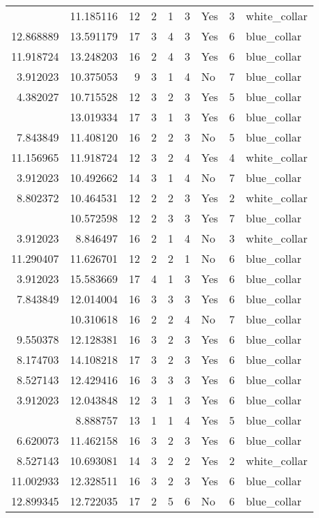 \documentclass[
]{article}
\begin{document}
\begin{longtable}[t]{rrrrrllrl}
\addlinespace
3.912023 & 11.185116 & 12 & 2 & 1 & 3 & Yes & 3 & white\_collar\\
12.868889 & 13.591179 & 17 & 3 & 4 & 3 & Yes & 6 & blue\_collar\\
11.918724 & 13.248203 & 16 & 2 & 4 & 3 & Yes & 6 & blue\_collar\\
3.912023 & 10.375053 & 9 & 3 & 1 & 4 & No & 7 & blue\_collar\\
4.382027 & 10.715528 & 12 & 3 & 2 & 3 & Yes & 5 & blue\_collar\\
\addlinespace
3.912023 & 13.019334 & 17 & 3 & 1 & 3 & Yes & 6 & blue\_collar\\
7.843849 & 11.408120 & 16 & 2 & 2 & 3 & No & 5 & blue\_collar\\
11.156965 & 11.918724 & 12 & 3 & 2 & 4 & Yes & 4 & white\_collar\\
3.912023 & 10.492662 & 14 & 3 & 1 & 4 & No & 7 & blue\_collar\\
8.802372 & 10.464531 & 12 & 2 & 2 & 3 & Yes & 2 & white\_collar\\
\addlinespace
12.206323 & 10.572598 & 12 & 2 & 3 & 3 & Yes & 7 & blue\_collar\\
3.912023 & 8.846497 & 16 & 2 & 1 & 4 & No & 3 & white\_collar\\
11.290407 & 11.626701 & 12 & 2 & 2 & 1 & No & 6 & blue\_collar\\
3.912023 & 15.583669 & 17 & 4 & 1 & 3 & Yes & 6 & blue\_collar\\
7.843849 & 12.014004 & 16 & 3 & 3 & 3 & Yes & 6 & blue\_collar\\
\addlinespace
8.707814 & 10.310618 & 16 & 2 & 2 & 4 & No & 7 & blue\_collar\\
9.550378 & 12.128381 & 16 & 3 & 2 & 3 & Yes & 6 & blue\_collar\\
8.174703 & 14.108218 & 17 & 3 & 2 & 3 & Yes & 6 & blue\_collar\\
8.527143 & 12.429416 & 16 & 3 & 3 & 3 & Yes & 6 & blue\_collar\\
3.912023 & 12.043848 & 12 & 3 & 1 & 3 & Yes & 6 & blue\_collar\\
\addlinespace
3.912023 & 8.888757 & 13 & 1 & 1 & 4 & Yes & 5 & blue\_collar\\
6.620073 & 11.462158 & 16 & 3 & 2 & 3 & Yes & 6 & blue\_collar\\
8.527143 & 10.693081 & 14 & 3 & 2 & 2 & Yes & 2 & white\_collar\\
11.002933 & 12.328511 & 16 & 3 & 2 & 3 & Yes & 6 & blue\_collar\\
12.899345 & 12.722035 & 17 & 2 & 5 & 6 & No & 6 & blue\_collar\\

\end{longtable}
\end{document}
